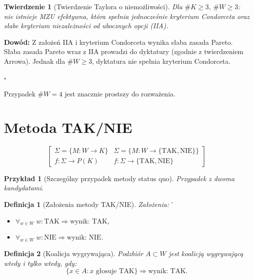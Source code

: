 \documentclass[12pt,a4paper]{article}
\newcounter{twierdzenie}
\theoremstyle{break}
\newtheorem{definition}{Definicja}[section]
\newtheorem{theorem}{Twierdzenie}[section]
\newtheorem{example}{Przykład}[section]
\begin{document}
\begin{theorem}[Twierdzenie Taylora o niemożliwości]
	Dla $\# K \geq 3$, $\# W \geq 3$:  
	nie istnieje MZU efektywna, która spełnia jednocześnie kryterium Condorceta oraz słabe kryterium niezależności od ubocznych opcji (IIA).
\end{theorem}

\noindent \textbf{Dowód:}  
Z założeń IIA i kryterium Condorceta wynika słaba zasada Pareto.  
Słaba zasada Pareto wraz z IIA prowadzi do dyktatury (zgodnie z twierdzeniem Arrowa).  
Jednak dla $\# W \geq 3$, dyktatura nie spełnia kryterium Condorceta.  
\begin{flushright}$\square$\end{flushright}

Przypadek $\# W = 4$ jest znacznie prostszy do rozważenia.

\newpage

\section{Metoda TAK/NIE}
$$
\begin{bmatrix}
	\Sigma = \{ M: W \rightarrow K \} & \Sigma = \{ M: W \rightarrow \{ \text{TAK}, \text{NIE} \} \} \\
	f:\Sigma \rightarrow P(K) & f:\Sigma \rightarrow \{ \text{TAK}, \text{NIE} \}
\end{bmatrix}
$$

\begin{example}[Szczególny przypadek metody status quo]
	Przypadek z dwoma kandydatami.
\end{example}
\begin{definition}[Założenia metody TAK/NIE]
	 Założenia:´
	
	\begin{itemize}
		\item $\forall_{w \in W} \; w : \text{TAK} \Rightarrow \text{wynik: TAK}$,
		\item $\forall_{w \in W} \; w : \text{NIE} \Rightarrow \text{wynik: NIE}$.
	\end{itemize}
\end{definition}



\begin{definition}[Koalicja wygrywająca]
	Podzbiór $A \subset W$ jest koalicją wygrywającą wtedy i tylko wtedy, gdy:  
	$$\{x \in A : x \text{ głosuje TAK} \} \Rightarrow \text{wynik: TAK.}$$
\end{definition}
\end{document}
